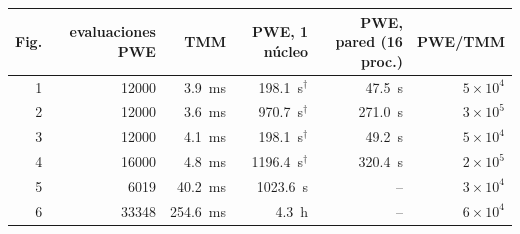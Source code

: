 \begin{tabular}{rrrrrr}
\toprule
Fig. & evaluaciones PWE & TMM & PWE, 1 núcleo & PWE, pared (16 proc.) & PWE/TMM \\
\midrule
1 & 12000 & 3.9~ms & 198.1~s$^\dagger$ & 47.5~s & $5\times10^{4}$ \\
2 & 12000 & 3.6~ms & 970.7~s$^\dagger$ & 271.0~s & $3\times10^{5}$ \\
3 & 12000 & 4.1~ms & 198.1~s$^\dagger$ & 49.2~s & $5\times10^{4}$ \\
4 & 16000 & 4.8~ms & 1196.4~s$^\dagger$ & 320.4~s & $2\times10^{5}$ \\
5 & 6019 & 40.2~ms & 1023.6~s & -- & $3\times10^{4}$ \\
6 & 33348 & 254.6~ms & 4.3~h & -- & $6\times10^{4}$ \\
\bottomrule
\end{tabular}
